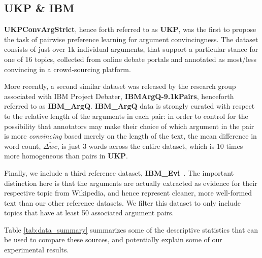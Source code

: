 \documentclass[runningheads]{llncs}
\begin{document}
\subsection{UKP \& IBM}
\textbf{UKPConvArgStrict}\cite{habernal_which_2016}, hence forth referred to as 
\textbf{UKP}, was the first to propose the task of pairwise preference learning 
for argument convincingness. 
The dataset consists of just over 1k individual arguments, that support a 
particular stance for one of 16 topics, collected from online debate portals 
and annotated as most/less convincing in a crowd-sourcing platform.  

More recently, a second similar dataset was released by the research group 
associated with IBM Project Debater, 
\textbf{IBMArgQ-9.1kPairs}\cite{toledo_automatic_2019}, henceforth 
referred to as \textbf{IBM\_ArgQ}.
\textbf{IBM\_ArgQ} data is strongly curated with respect to the relative length 
of the arguments in each pair: in order to control for the possibility that 
annotators may make their choice of which argument in the pair is more 
\textit{convincing} based merely on the length of the text, the mean difference 
in word count, $\overline{\Delta wc}$, is just 3 words across the entire 
dataset, which is 10 times more homogeneous than pairs in \textbf{UKP}.

Finally, we include a third reference dataset, 
\textbf{IBM\_Evi}~\cite{gleize_are_2019}. 
The important distinction here is that the arguments are actually extracted as 
evidence for their respective topic from Wikipedia, and hence represent 
cleaner, more well-formed text than our other reference datasets. 
We filter this dataset to only include topics that have at least 50 associated 
argument pairs.

Table \ref{tab:data_summary} summarizes some of the descriptive statistics that 
can be used to compare these sources, and potentially explain some of our 
experimental results. 

\begin{table}
	\caption{Descriptive statistics for each dataset of argument pairs, with 
		last rows showing \textbf{dalite} data split by discipline. 
		$N_{\mathrm{args}}$ 
		is the number of individual arguments, distributed across $N_{\mathrm{pairs}}$ 
		revolving around $N_{\mathrm{topics}}$. $N_{\mathrm{vocab}}$ is the number of unique 
		tokens in all the arguments. $\overline{wc}$ is the average number of 
		words per argument, shown with the standard deviation $(SD)$. 
		$\overline{\Delta wc}$ is the average relative difference in number of 
		words for each argument in each pair.%
		}
	\centerline{}
	\label{tab:data_summary}
\end{table}
\end{document}
